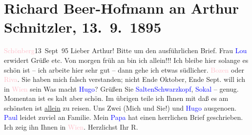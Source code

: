 

               \section[Richard Beer-Hofmann an Arthur Schnitzler, 13. 9. 1895]{ Richard Beer-Hofmann an Arthur Schnitzler,
               13. 9. 1895}\nopagebreak{}\rehead{ }\normalsize\beginnumbering{} \toendnotes[C]{\smallbreak\pagebreak[2]} 
\toendnotes[C]{\smallbreak}\pstart
           \raggedleft{}{\pb}\textcolor{pink}{Schönberg}{}\ledrightnote{\textcolor{pink}{Schönberg im Stubaital}}{ }13 Sept 95\pend
           \pstart
           Lieber Arthur! Bitte um den ausführlichen Brief. Frau \textcolor{blue}{Lou}{}\ledrightnote{\textcolor{blue}{Lou Andreas-Salomé}} erwidert Grüße etc. Von morgen früh an bin ich
               allein!!! Ich bleibe hier solange es schön ist – ich arbeite hier sehr gut – dann
               gehe ich etwas südlicher. \textcolor{pink}{Bozen}{}\ledrightnote{\textcolor{pink}{Bozen}} oder \textcolor{pink}{Riva}{}\ledrightnote{\textcolor{pink}{Riva del Garda}}. Sie haben mich falsch verstanden; nicht
                  Ende Oktober, Ende Sept. will ich in \textcolor{pink}{Wien}{}\ledrightnote{\textcolor{pink}{Wien}}
                sein\pend
           \pstart
           {\pb}Was macht \textcolor{blue}{Hugo}{}\ledrightnote{\textcolor{blue}{Hugo von Hofmannsthal}}? Grüßen Sie \textcolor{blue}{Salten}{}\ledrightnote{\textcolor{blue}{Felix Salten}}{ }\textcolor{blue}{Schwarzkopf}{}\ledrightnote{\textcolor{blue}{Gustav Schwarzkopf}}, \textcolor{blue}{Sokal}{}\ledrightnote{\textcolor{blue}{Clemens Sokal}} – genug. Momentan ist es kalt aber schön. Im übrigen teile ich Ihnen mit daß es am schönsten
               ist \uline{allein} zu reisen. Uns Zwei \introOben{}(Mich und Sie!)\introOben{} und \textcolor{blue}{Hugo}{}\ledrightnote{\textcolor{blue}{Hugo von Hofmannsthal}} ausgeno{\geminationm}en. \textcolor{blue}{Paul}{}\ledrightnote{\textcolor{blue}{Paul Goldmann}} leidet
               zuviel an Familie. Mein \textcolor{blue}{Papa}{}
               hat einen herrlichen Brief geschrieben. Ich zeig ihn Ihnen in \textcolor{pink}{Wien}{}\ledrightnote{\textcolor{pink}{Wien}}. Herzlichst Ihr\pend
           \pstart \spacefill\mbox{R.}\pend{}\endnumbering{}  
      